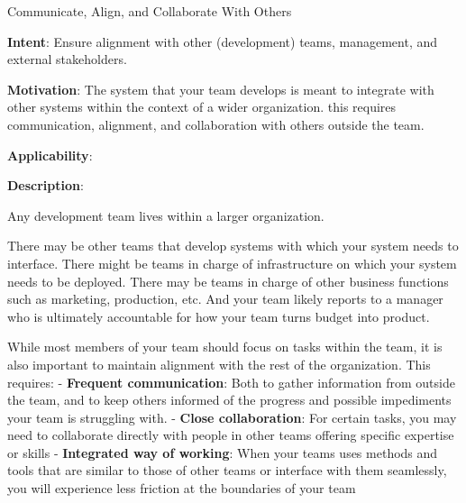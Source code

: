   
  \begin{frame}[plain]{ Communicate, Align, and Collaborate With Others
 }

  \textbf{Intent}: Ensure alignment with other (development) teams, management, and external stakeholders. 
 

  \textbf{Motivation}: The system that your team develops is meant to integrate with other systems within the context of a wider organization. this requires communication, alignment, and collaboration with others outside the team.
 

  \textbf{Applicability}:  
 

  \textbf{Description}: 

Any development team lives within a larger organization.


There may be other teams that develop systems with which your system needs to interface. There might be teams in charge of infrastructure on which your system needs to be deployed. There may be teams in charge of other business functions such as marketing, production, etc. And your team likely reports to a manager who is ultimately accountable for how your team turns budget into product.


While most members of your team should focus on tasks within the team, it is also important to maintain alignment with the rest of the organization. This requires:
- \textbf{Frequent communication}: Both to gather information from outside the team, and to keep others informed of the progress and possible impediments your team is struggling with.
- \textbf{Close collaboration}: For certain tasks, you may need to collaborate directly with people in other teams offering specific expertise or skills
- \textbf{Integrated way of working}: When your teams uses methods and tools that are similar to those of other teams or interface with them seamlessly, you will experience less friction at the boundaries of your team


 


  \end{frame}

